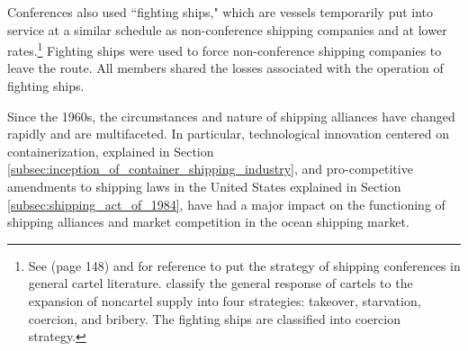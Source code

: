 \documentclass[11pt]{article}
\begin{document}

Conferences also used ``fighting ships," which are vessels temporarily put into service at a similar schedule as non-conference shipping companies and at lower rates.\footnote{See \cite{marshall2014economics} (page 148) and \cite{harrington2018rent} for reference to put the strategy of shipping conferences in general cartel literature. \cite{harrington2018rent} classify the general response of cartels to the expansion of noncartel supply into four strategies: takeover,
starvation, coercion, and bribery. The fighting ships are classified into coercion strategy.} Fighting ships were used to force non-conference shipping companies to leave the route. All members shared the losses associated with the operation of fighting ships.

Since the 1960s, the circumstances and nature of shipping alliances have changed rapidly and are multifaceted. In particular, technological innovation centered on containerization, explained in Section \ref{subsec:inception_of_container_shipping_industry}, and pro-competitive amendments to shipping laws in the United States explained in Section \ref{subsec:shipping_act_of_1984}, have had a major impact on the functioning of shipping alliances and market competition in the ocean shipping market.



\end{document}
